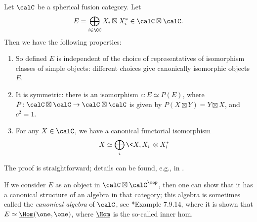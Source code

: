 \begin{lemma}\label{l:spherical-E}
  Let $\calC$ be a spherical fusion category. Let
  \begin{equation}\label{e:spherical-E}
    E = \bigoplus_{i\in \OC} X_i\boxtimes X_i^*\in \calC\boxtimes\calC.
  \end{equation}
  Then we have the following properties:
  \begin{enumerate}
    \item So defined $E$ is independent of the choice of representatives of
    isomorphism classes of simple objects: different choices give canonically
    isomorphic objects $E$.

    \item It is symmetric: there is an isomorphism $c\colon E\simeq P(E)$, where
    $P \colon \calC\boxtimes\calC \to \calC\boxtimes \calC$ is given by
    $P(X\boxtimes Y)= Y\boxtimes X$, and $c^2=1$.

    \item For any $X\in \calC$, we have a canonical functorial isomorphism
    $$
      X \simeq \bigoplus_i\<X, X_i\>\otimes X_i^*
    $$
  \end{enumerate}
\end{lemma}
 The proof  is straightforward; details can be found, e.g.,
  in .
\begin{remark}
  If we consider $E$ as an object in $\calC\boxtimes\calC^\mop$, then one can
  show that it has a canonical structure of an algebra in that category; this
  algebra is sometimes called the \emph{canonical algebra} of $\calC$, see
  *{Example 7.9.14}, where it is shown that $E\simeq
  \underline{\Hom}(\one,\one)$, where $\underline{\Hom}$ is the so-called inner
  hom.
\end{remark}

